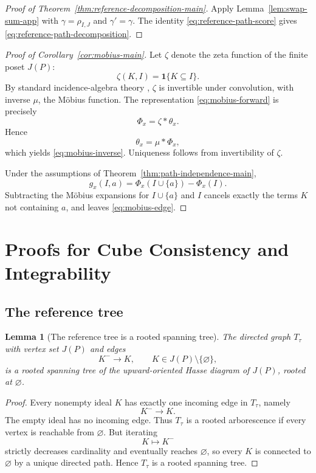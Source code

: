 \documentclass{article}
\newtheorem{lemma}[theorem]{Lemma}
\theoremstyle{definition}
\newcommand{\one}{\mathbf 1}
\begin{document}
\begin{proof}[Proof of Theorem~\ref{thm:reference-decomposition-main}]
Apply Lemma~\ref{lem:swap-sum-app} with \(\gamma=\rho_{I,J}\) and \(\gamma'=\gamma\). The identity \eqref{eq:reference-path-score} gives \eqref{eq:reference-path-decomposition}.
\end{proof}

\begin{proof}[Proof of Corollary~\ref{cor:mobius-main}]
Let \(\zeta\) denote the zeta function of the finite poset \(J(P)\):
\[
\zeta(K,I)=\one\{K\subseteq I\}.
\]
By standard incidence-algebra theory \cite{rota1964,stanley2011ec1}, \(\zeta\) is invertible under convolution, with inverse \(\mu\), the M\"obius function. The representation \eqref{eq:mobius-forward} is precisely
\[
\Phi_x=\zeta * \theta_x.
\]
Hence
\[
\theta_x=\mu * \Phi_x,
\]
which yields \eqref{eq:mobius-inverse}. Uniqueness follows from invertibility of \(\zeta\).

Under the assumptions of Theorem~\ref{thm:path-independence-main},
\[
g_x(I,a)=\Phi_x(I\cup\{a\})-\Phi_x(I).
\]
Subtracting the M\"obius expansions for \(I\cup\{a\}\) and \(I\) cancels exactly the terms \(K\) not containing \(a\), and leaves \eqref{eq:mobius-edge}.
\end{proof}

\section{Proofs for Cube Consistency and Integrability}
\label{app:integrability}

\subsection{The reference tree}

\begin{lemma}[The reference tree is a rooted spanning tree]
\label{lem:tree-app}
The directed graph \(T_\tau\) with vertex set \(J(P)\) and edges
\[
K^- \to K,\qquad K\in J(P)\setminus\{\varnothing\},
\]
is a rooted spanning tree of the upward-oriented Hasse diagram of \(J(P)\), rooted at \(\varnothing\).
\end{lemma}

\begin{proof}
Every nonempty ideal \(K\) has exactly one incoming edge in \(T_\tau\), namely
\[
K^- \to K.
\]
The empty ideal has no incoming edge. Thus \(T_\tau\) is a rooted arborescence if every vertex is reachable from \(\varnothing\). But iterating
\[
K\mapsto K^-
\]
strictly decreases cardinality and eventually reaches \(\varnothing\), so every \(K\) is connected to \(\varnothing\) by a unique directed path. Hence \(T_\tau\) is a rooted spanning tree.
\end{proof}
\end{document}
